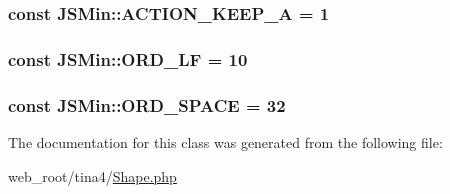 \subsubsection[{A\+C\+T\+I\+O\+N\+\_\+\+K\+E\+E\+P\+\_\+\+A}]{\setlength{\rightskip}{0pt plus 5cm}const J\+S\+Min\+::\+A\+C\+T\+I\+O\+N\+\_\+\+K\+E\+E\+P\+\_\+\+A = 1}\label{classJSMin_aadc96fb8e03e7fd45dcc845695db56f6}
\hypertarget{classJSMin_ac2104a1ac3a1d438c01c88b7bfafd519}{}
\subsubsection[{O\+R\+D\+\_\+\+L\+F}]{\setlength{\rightskip}{0pt plus 5cm}const J\+S\+Min\+::\+O\+R\+D\+\_\+\+L\+F = 10}\label{classJSMin_ac2104a1ac3a1d438c01c88b7bfafd519}
\hypertarget{classJSMin_acae1641c88dbf4928c4a3c5b2428065c}{}
\subsubsection[{O\+R\+D\+\_\+\+S\+P\+A\+C\+E}]{\setlength{\rightskip}{0pt plus 5cm}const J\+S\+Min\+::\+O\+R\+D\+\_\+\+S\+P\+A\+C\+E = 32}\label{classJSMin_acae1641c88dbf4928c4a3c5b2428065c}


The documentation for this class was generated from the following file\+:\begin{DoxyCompactItemize}
\item 
web\+\_\+root/tina4/\hyperlink{Shape_8php}{Shape.\+php}\end{DoxyCompactItemize}
